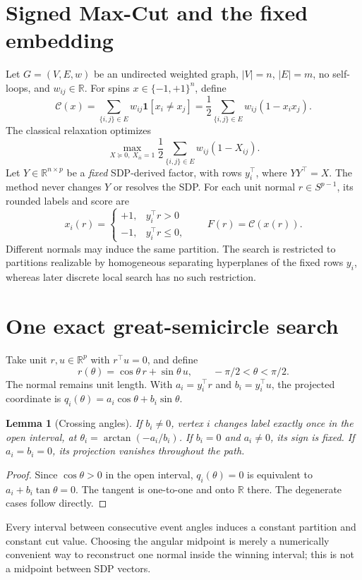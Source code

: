 \documentclass[10pt,letterpaper]{article}
\newtheorem{lemma}{Lemma}
\newcommand{\RR}{\mathbb R}
\newcommand{\Ccut}{\mathcal C}
\newcommand{\one}{\mathbf 1}
\begin{document}
\section{Signed Max-Cut and the fixed embedding}
Let \(G=(V,E,w)\) be an undirected weighted graph, \(|V|=n\), \(|E|=m\), no self-loops, and \(w_{ij}\in\RR\). For spins \(x\in\{-1,+1\}^n\), define
\begin{equation}\label{eq:cut}
\Ccut(x)=\sum_{\{i,j\}\in E}w_{ij}\one[x_i\ne x_j]
=\frac12\sum_{\{i,j\}\in E}w_{ij}(1-x_ix_j).
\end{equation}
The classical relaxation optimizes
\begin{equation}\label{eq:sdp}
\max_{X\succeq0,\ X_{ii}=1}\frac12\sum_{\{i,j\}\in E}w_{ij}(1-X_{ij}).
\end{equation}
Let \(Y\in\RR^{n\times p}\) be a \emph{fixed} SDP-derived factor, with rows \(y_i^\top\), where \(YY^\top=X\). The method never changes \(Y\) or resolves the SDP. For each unit normal \(r\in S^{p-1}\), its rounded labels and score are
\begin{equation}\label{eq:round}
x_i(r)=\begin{cases}+1,&y_i^\top r>0\\-1,&y_i^\top r\le0,\end{cases}
\qquad F(r)=\Ccut(x(r)).
\end{equation}
Different normals may induce the same partition. The search is restricted to partitions realizable by homogeneous separating hyperplanes of the fixed rows \(y_i\), whereas later discrete local search has no such restriction.

\section{One exact great-semicircle search}
Take unit \(r,u\in\RR^p\) with \(r^\top u=0\), and define
\begin{equation}\label{eq:arc}
r(\theta)=\cos\theta\,r+\sin\theta\,u,\qquad -\pi/2<\theta<\pi/2.
\end{equation}
The normal remains unit length. With \(a_i=y_i^\top r\) and \(b_i=y_i^\top u\), the projected coordinate is
\(q_i(\theta)=a_i\cos\theta+b_i\sin\theta\).
\begin{lemma}[Crossing angles]\label{lem:roots}
If \(b_i\ne0\), vertex \(i\) changes label exactly once in the open interval, at \(\theta_i=\arctan(-a_i/b_i)\). If \(b_i=0\) and \(a_i\ne0\), its sign is fixed. If \(a_i=b_i=0\), its projection vanishes throughout the path.
\end{lemma}
\begin{proof}
Since \(\cos\theta>0\) in the open interval, \(q_i(\theta)=0\) is equivalent to \(a_i+b_i\tan\theta=0\). The tangent is one-to-one and onto \(\RR\) there. The degenerate cases follow directly.
\end{proof}
Every interval between consecutive event angles induces a constant partition and constant cut value. Choosing the angular midpoint is merely a numerically convenient way to reconstruct one normal inside the winning interval; this is not a midpoint between SDP vectors.
\end{document}
